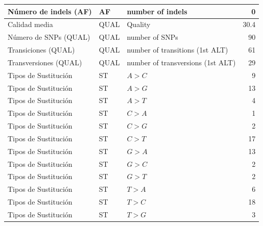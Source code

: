 \documentclass[12pt]{article}
\begin{document}
\begin{longtable}{|l|l|p{8cm}|r|}
    \hline
    Número de indels (AF) & AF & number of indels & 0 \\
    \hline
    Calidad media & QUAL & Quality & 30.4 \\
    \hline
    Número de SNPs (QUAL) & QUAL & number of SNPs & 90 \\
    \hline
    Transiciones (QUAL) & QUAL & number of transitions (1st ALT) & 61 \\
    \hline
    Transversiones (QUAL) & QUAL & number of transversions (1st ALT) & 29 \\
    \hline
    Tipos de Sustitución & ST & $A > C $ & 9 \\
    \hline
    Tipos de Sustitución & ST & $A > G $ & 13 \\
    \hline
    Tipos de Sustitución & ST & $ A > T $ & 4 \\
    \hline
    Tipos de Sustitución & ST & $ C > A $ & 1 \\
    \hline
    Tipos de Sustitución & ST & $ C > G $ & 2 \\
    \hline
    Tipos de Sustitución & ST & $ C > T $ & 17 \\
    \hline
    Tipos de Sustitución & ST & $ G > A $ & 13 \\
    \hline
    Tipos de Sustitución & ST & $ G > C $ & 2 \\
    \hline
    Tipos de Sustitución & ST & $ G > T $ & 2 \\
    \hline
    Tipos de Sustitución & ST & $ T > A $ & 6 \\
    \hline
    Tipos de Sustitución & ST & $ T > C $ & 18 \\
    \hline
    Tipos de Sustitución & ST & $ T > G $  & 3 \\
    \hline
    
\end{longtable}



\clearpage
\singlespacing %
\end{document}
